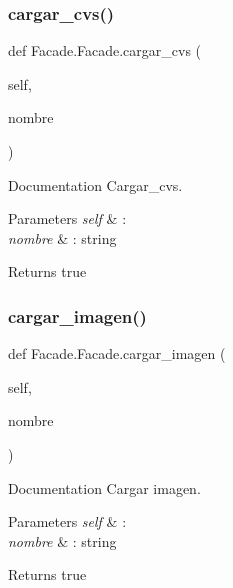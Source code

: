 \subsubsection{\texorpdfstring{cargar\+\_\+cvs()}{cargar\_cvs()}}
{\footnotesize\ttfamily def Facade.\+Facade.\+cargar\+\_\+cvs (\begin{DoxyParamCaption}\item[{}]{self,  }\item[{}]{nombre }\end{DoxyParamCaption})}



Documentation Cargar\+\_\+cvs. 


\begin{DoxyParams}{Parameters}
{\em self} & \+: \\
\hline
{\em nombre} & \+: string \\
\hline
\end{DoxyParams}
\begin{DoxyReturn}{Returns}
true 
\end{DoxyReturn}
\mbox{\label{class_facade_1_1_facade_ab29afbe3462ddbb2e6d8203d20f610ae}} 
\subsubsection{\texorpdfstring{cargar\+\_\+imagen()}{cargar\_imagen()}}
{\footnotesize\ttfamily def Facade.\+Facade.\+cargar\+\_\+imagen (\begin{DoxyParamCaption}\item[{}]{self,  }\item[{}]{nombre }\end{DoxyParamCaption})}



Documentation Cargar imagen. 


\begin{DoxyParams}{Parameters}
{\em self} & \+: \\
\hline
{\em nombre} & \+: string ~\newline
 \\
\hline
\end{DoxyParams}
\begin{DoxyReturn}{Returns}
true 
\end{DoxyReturn}
\mbox{\label{class_facade_1_1_facade_a1771449006d9324bae3c3449f59b8fe6}} 
